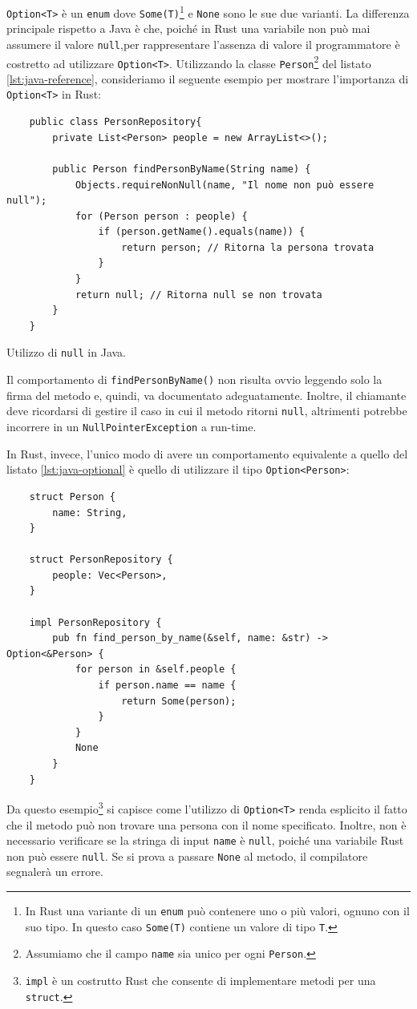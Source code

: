 \texttt{Option<T>} è un \texttt{enum} dove \texttt{Some(T)}\footnote{In Rust una variante di un \texttt{enum} può contenere uno o più valori, ognuno con il suo tipo. In questo caso \texttt{Some(T)} contiene un valore di tipo \texttt{T}.} e \texttt{None} sono le sue due varianti. La differenza principale rispetto a Java è che, poiché in Rust una variabile non può mai assumere il valore \texttt{null},per rappresentare l'assenza di valore il programmatore è costretto ad utilizzare \texttt{Option<T>}. Utilizzando la classe \texttt{Person}\footnote{Assumiamo che il campo \texttt{name} sia unico per ogni \texttt{Person}.} del listato \ref{lst:java-reference}, consideriamo il seguente esempio per mostrare l'importanza di \texttt{Option<T>} in Rust: 
\begin{listing}[h]
    \begin{verbatim}
    public class PersonRepository{
        private List<Person> people = new ArrayList<>();

        public Person findPersonByName(String name) {
            Objects.requireNonNull(name, "Il nome non può essere null");
            for (Person person : people) {
                if (person.getName().equals(name)) {
                    return person; // Ritorna la persona trovata
                }
            }
            return null; // Ritorna null se non trovata
        }
    }
    \end{verbatim}
    \caption{Utilizzo di \texttt{null} in Java.}
    \label{lst:java-optional}
\end{listing}

Il comportamento di \texttt{findPersonByName()} non risulta ovvio leggendo solo la firma del metodo e, quindi, va documentato adeguatamente. Inoltre, il chiamante deve ricordarsi di gestire il caso in cui il metodo ritorni \texttt{null}, altrimenti potrebbe incorrere in un \texttt{NullPointerException} a run-time. 

In Rust, invece, l'unico modo di avere un comportamento equivalente a quello del listato \ref{lst:java-optional} è quello di utilizzare il tipo \texttt{Option<Person>}:
\begin{verbatim}
    struct Person {
        name: String,
    }

    struct PersonRepository {
        people: Vec<Person>,
    }

    impl PersonRepository {
        pub fn find_person_by_name(&self, name: &str) -> Option<&Person> {
            for person in &self.people {
                if person.name == name {
                    return Some(person); 
                }
            }
            None
        }
    }
\end{verbatim}
Da questo esempio\footnote{\texttt{impl} è un costrutto Rust che consente di implementare metodi per una \texttt{struct}.} si capisce come l'utilizzo di \texttt{Option<T>} renda esplicito il fatto che il metodo può non trovare una persona con il nome specificato. Inoltre, non è necessario verificare se la stringa di input \texttt{name} è \texttt{null}, poiché una variabile Rust non può essere \texttt{null}. Se si prova a passare \texttt{None} al metodo, il compilatore segnalerà un errore.

